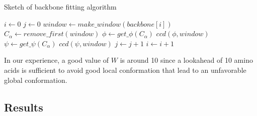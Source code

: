\begin{algorithm}
\caption{Sketch of backbone fitting algorithm}
\label{alg:ccd}
\begin{algorithmic}
	\STATE $i \gets 0$
		\STATE $j \gets 0$
			\STATE $window \gets make\_window(backbone[i])$
				\STATE $C_\alpha \gets remove\_first(window)$
				\STATE $\phi \gets get\_\phi(C_\alpha)$
				\STATE $ccd(\phi,window)$
				\STATE $\psi \gets get\_\psi(C_\alpha)$
				\STATE $ccd(\psi,window)$
			\ENDWHILE
			\STATE $j \gets j+1$
		\ENDWHILE
		\STATE $i \gets i+1$
	\ENDWHILE
\end{algorithmic}
\end{algorithm}

In our experience, a good value of $W$ is around 10 since a lookahead of 10 amino acids is sufficient to avoid good local conformation that lead to an unfavorable global conformation.


\subsection{Results}

